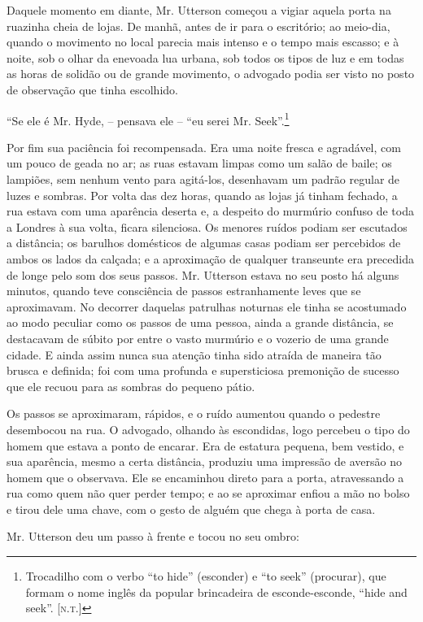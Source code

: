 Daquele momento em diante, Mr. Utterson começou a vigiar aquela porta na
ruazinha cheia de lojas.  De manhã, antes de ir para o escritório; ao
meio-dia, quando o movimento no local parecia mais intenso e o tempo
mais escasso; e à noite, sob o olhar da enevoada lua urbana, sob todos
os tipos de luz e em todas as horas de solidão ou de grande movimento,
o advogado podia ser visto no posto de observação que tinha escolhido.

“Se ele é Mr. Hyde, -- pensava ele -- “eu serei Mr. Seek”.\footnote{ Trocadilho
com o verbo “to hide” (esconder) e “to seek” (procurar), que formam o nome
inglês da popular brincadeira de esconde-esconde, “hide and seek”. [\textsc{n.t.}]}

Por fim sua paciência foi recompensada.  Era uma noite fresca e
agradável, com um pouco de geada no ar; as ruas estavam limpas como um
salão de baile; os lampiões, sem nenhum vento para agitá-los,
desenhavam um padrão regular de luzes e sombras.  Por volta das dez
horas, quando as lojas já tinham fechado, a rua estava com uma
aparência deserta e, a despeito do murmúrio confuso de toda a Londres à
sua volta, ficara silenciosa.  Os menores ruídos podiam ser escutados a
distância; os barulhos domésticos de algumas casas podiam ser
percebidos de ambos os lados da calçada;  e a aproximação de qualquer
transeunte era precedida de longe pelo som dos seus passos. Mr.
Utterson estava no seu posto há alguns minutos, quando teve consciência
de passos estranhamente leves que se aproximavam.  No decorrer daquelas
patrulhas noturnas ele tinha se acostumado ao modo peculiar como os
passos de uma pessoa, ainda a grande distância, se destacavam de súbito
por entre o vasto murmúrio e o vozerio de uma grande cidade.  E ainda
assim nunca sua atenção tinha sido atraída de maneira tão brusca e
definida; foi com uma profunda e supersticiosa premonição de sucesso
que ele recuou para as sombras do pequeno pátio.

Os passos se aproximaram, rápidos, e o ruído aumentou quando o pedestre
desembocou na rua.  O advogado, olhando às escondidas, logo percebeu o
tipo do homem que estava a ponto de encarar.  Era de estatura pequena,
bem vestido, e sua aparência, mesmo a certa distância, produziu uma
impressão de aversão no homem que o observava.  Ele se encaminhou
direto para a porta, atravessando a rua como quem não quer perder
tempo; e ao se aproximar enfiou a mão no bolso e tirou dele uma chave,
com o gesto de alguém que chega à porta de casa.  

Mr. Utterson deu um passo à frente e tocou no seu ombro:

